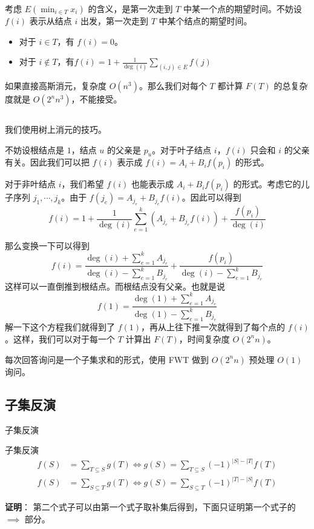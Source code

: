 \documentclass[UTF8]{beamer}
\begin{document}
    \begin{frame}
        考虑 $E(\min_{i\in T}x_i)$ 的含义，是第一次走到 $T$ 中某一个点的期望时间。不妨设 $f(i)$ 表示从结点 $i$ 出发，第一次走到 $T$ 中某个结点的期望时间。
        \begin{itemize}
            \item 对于 $i\in T$，有 $f(i)=0$。
            \item 对于 $i\notin T$，有$
            \displaystyle f(i)=1+\frac{1}{\operatorname{deg}(i)}\sum_{(i,j)\in E}f(j)
            $
        \end{itemize}
        如果直接高斯消元，复杂度 $O(n^3)$。那么我们对每个 $T$ 都计算 $F(T)$ 的总复杂度就是 $O(2^nn^3)$，不能接受。
        \pause
        
        $\ $

        我们使用树上消元的技巧。

        不妨设根结点是 $1$，结点 $u$ 的父亲是 $p_u$。对于叶子结点 $i$，$f(i)$ 只会和 $i$ 的父亲有关。因此我们可以把 $f(i)$ 表示成 $f(i)=A_i+B_if(p_i)$ 的形式。

        对于非叶结点 $i$，我们希望 $f(i)$ 也能表示成 $A_i+B_if(p_i)$ 的形式。考虑它的儿子序列 $j_1,\cdots,j_k$。由于 $f(j_e)=A_{j_e}+B_{j_e}f(i)$。因此可以得到
        \vspace{-1em}
        $$
        f(i)=1+\frac{1}{\deg(i)}\sum_{e=1}^k\left(A_{j_e}+B_{j_e}f(i)\right)+\frac{f(p_i)}{\deg(i)}
        $$
    \end{frame}
    \begin{frame}
    那么变换一下可以得到
    $$
    f(i)=\frac{\deg(i)+\sum_{e=1}^kA_{j_e}}{\deg(i)-\sum_{e=1}^kB_{j_e}}+
    \frac{f(p_i)}{\deg(i)-\sum_{e=1}^kB_{j_e}}
    $$
    这样可以一直倒推到根结点。而根结点没有父亲。也就是说
    $$
    f(1)=\frac{\deg(1)+\sum_{e=1}^kA_{j_e}}{\deg(1)-\sum_{e=1}^kB_{j_e}}
    $$
    解一下这个方程我们就得到了 $f(1)$，再从上往下推一次就得到了每个点的 $f(i)$。这样，我们可以对于每一个 $T$ 计算出 $F(T)$，时间复杂度 $O(2^nn)$。

    \pause

    每次回答询问是一个子集求和的形式，使用 FWT 做到 $O(2^nn)$ 预处理 $O(1)$ 询问。
    \end{frame}


    \subsection{子集反演}
    \begin{frame}{子集反演}
        \begin{block}{子集反演}
            $$
            \begin{aligned}
                f(S)&=\sum_{T \subseteq S} g(T) \iff g(S)=\sum_{T \subseteq S}(-1)^{|S|-|T|} f(T)\\
                f(S)&=\sum_{S\subseteq T} g(T) \iff g(S)=\sum_{S\subseteq T} (-1)^{|T|-|S|} f(T)
            \end{aligned}
            $$
        \end{block}
        \pause
        \textbf{证明}：
        第二个式子可以由第一个式子取补集后得到，下面只证明第一个式子的 $\implies $ 部分。
    \end{frame}
\end{document}

